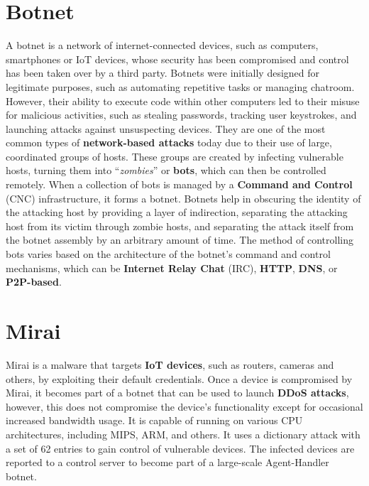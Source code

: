 \section{Botnet}

A botnet is a network of internet-connected devices, such as computers, smartphones or IoT devices, whose security has been compromised and control has been taken over by a third party. Botnets were initially designed for legitimate purposes, such as automating repetitive tasks or managing chatroom. However, their ability to execute code within other computers led to their misuse for malicious activities, such as stealing passwords, tracking user keystrokes, and launching attacks against unsuspecting devices. \cite{fortinet-botnet} They are one of the most common types of \textbf{network-based attacks} today due to their use of large, coordinated groups of hosts. These groups are created by infecting vulnerable hosts,  turning them into ``\textit{zombies}'' or \textbf{bots}, which can then be controlled remotely. When a collection of bots is managed by a \textbf{Command and Control} (CNC) infrastructure, it forms a botnet. Botnets help in obscuring the identity of the attacking host by providing a layer of indirection, separating the attacking host from its victim through zombie hosts, and separating the attack itself from the botnet assembly by an arbitrary amount of time. \cite{strayer2008botnet} The method of controlling bots varies based on the architecture of the botnet's command and control mechanisms, which can be \textbf{Internet Relay Chat} (IRC), \textbf{HTTP}, \textbf{DNS}, or \textbf{P2P-based}. 

\section{Mirai}

Mirai is a malware that targets \textbf{IoT devices}, such as routers, cameras and others, by exploiting their default credentials. Once a device is compromised by Mirai, it becomes part of a botnet that can be used to launch \textbf{DDoS attacks}, however, this does not compromise the device's functionality except for occasional increased bandwidth usage. It is capable of running on various CPU architectures, including MIPS, ARM, and others. It uses a dictionary attack with a set of 62 entries to gain control of vulnerable devices. The infected devices are reported to a control server to become part of a large-scale Agent-Handler botnet. \cite{de2018ddos}

